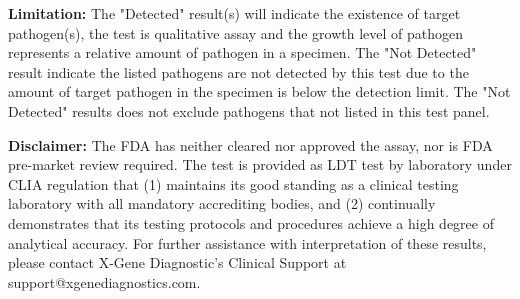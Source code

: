 \documentclass[10pt, letterpaper]{article}
\begin{document}
\vspace{15pt}

\noindent
\textbf{Limitation:} 
{\small The "Detected" result(s) will indicate the existence of target pathogen(s), the test is qualitative assay and the growth level of pathogen represents a relative amount of pathogen in a specimen. The "Not Detected" result indicate the listed pathogens are not detected by this test due to the amount of target pathogen in the specimen is below the detection limit.  The "Not Detected" results does not exclude pathogens that not listed in this test panel.}

\vspace{15pt}

\noindent
\textbf{Disclaimer:} 
{\small The FDA has neither cleared nor approved the assay, nor is FDA pre-market review required. The test is provided as LDT test by laboratory under CLIA regulation that (1) maintains its good standing as a clinical testing laboratory with all mandatory accrediting bodies, and (2) continually demonstrates that its testing protocols and procedures achieve a high degree of analytical accuracy. For further assistance with interpretation of these results, please contact X-Gene Diagnostic's Clinical Support at support@xgenediagnostics.com.}

\newpage


\noindent
\fontsize{9}{11}\selectfont 
{}
\end{document}

